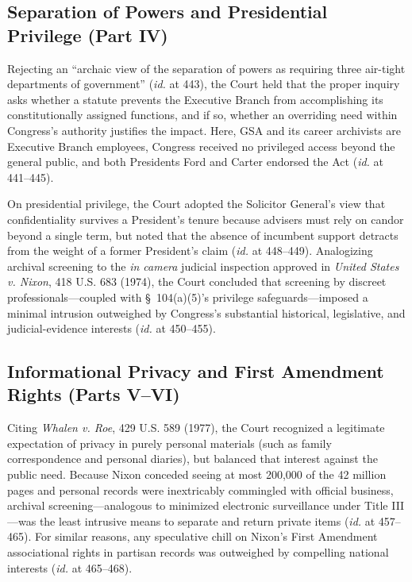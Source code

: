 \documentclass[12pt]{article}
\begin{document}
\subsection{Separation of Powers and Presidential Privilege (Part IV)}

Rejecting an ``archaic view of the separation of powers as requiring three air-tight departments of government'' (\textit{id.} at 443), the Court held that the proper inquiry asks whether a statute prevents the Executive Branch from accomplishing its constitutionally assigned functions, and if so, whether an overriding need within Congress's authority justifies the impact. Here, GSA and its career archivists are Executive Branch employees, Congress received no privileged access beyond the general public, and both Presidents Ford and Carter endorsed the Act (\textit{id.} at 441--445).

On presidential privilege, the Court adopted the Solicitor General's view that confidentiality survives a President's tenure because advisers must rely on candor beyond a single term, but noted that the absence of incumbent support detracts from the weight of a former President's claim (\textit{id.} at 448--449). Analogizing archival screening to the \textit{in camera} judicial inspection approved in \textit{United States v. Nixon}, 418 U.S. 683 (1974), the Court concluded that screening by discreet professionals---coupled with \S~104(a)(5)'s privilege safeguards---imposed a minimal intrusion outweighed by Congress's substantial historical, legislative, and judicial-evidence interests (\textit{id.} at 450--455).

\subsection{Informational Privacy and First Amendment Rights (Parts V--VI)}

Citing \textit{Whalen v. Roe}, 429 U.S. 589 (1977), the Court recognized a legitimate expectation of privacy in purely personal materials (such as family correspondence and personal diaries), but balanced that interest against the public need. Because Nixon conceded seeing at most 200,000 of the 42 million pages and personal records were inextricably commingled with official business, archival screening---analogous to minimized electronic surveillance under Title III---was the least intrusive means to separate and return private items (\textit{id.} at 457--465). For similar reasons, any speculative chill on Nixon's First Amendment associational rights in partisan records was outweighed by compelling national interests (\textit{id.} at 465--468).
\end{document}
